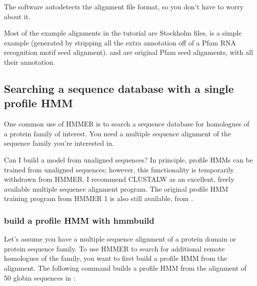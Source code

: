 The software autodetects the alignment file format, so you don't have
to worry about it.

Most of the example alignments in the tutorial are Stockholm
files.  is a simple example (generated by stripping all
the extra annotation off of a Pfam RNA recognition motif seed
alignment).   and  are original Pfam
seed alignments, with all their annotation. 

\subsection{Searching a sequence database with a single profile HMM}

One common use of HMMER is to search a sequence database for
homologues of a protein family of interest. You need a multiple
sequence alignment of the sequence family you're interested in.

\begin{srefaq}{Can I build a model from unaligned sequences?}
In principle, profile HMMs can be trained from unaligned sequences;
however, this functionality is temporarily withdrawn from HMMER.  I
recommend CLUSTALW as an excellent, freely available multiple sequence
alignment program. The original  profile HMM training
program from HMMER 1 is also still available, from
.
\end{srefaq}

\subsubsection{build a profile HMM with hmmbuild}

Let's assume you have a multiple sequence alignment of a protein
domain or protein sequence family. To use HMMER to search for
additional remote homologues of the family, you want to first build a
profile HMM from the alignment. The following command builds a profile
HMM from the alignment of 50 globin sequences in :


